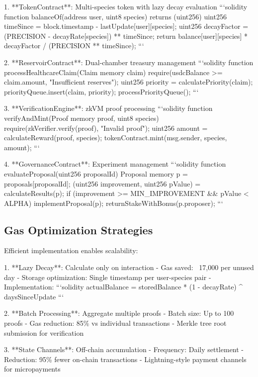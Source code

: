\documentclass[11pt,letterpaper]{article}
\begin{document}
1. **TokenContract**: Multi-species token with lazy decay evaluation
   ```solidity
   function balanceOf(address user, uint8 species) returns (uint256) {
       uint256 timeSince = block.timestamp - lastUpdate[user][species];
       uint256 decayFactor = (PRECISION - decayRate[species]) ** timeSince;
       return balance[user][species] * decayFactor / (PRECISION ** timeSince);
   }
   ```

2. **ReservoirContract**: Dual-chamber treasury management
   ```solidity
   function processHealthcareClaim(Claim memory claim) {
       require(usdcBalance >= claim.amount, "Insufficient reserves");
       uint256 priority = calculatePriority(claim);
       priorityQueue.insert(claim, priority);
       processPriorityQueue();
   }
   ```

3. **VerificationEngine**: zkVM proof processing
   ```solidity
   function verifyAndMint(Proof memory proof, uint8 species) {
       require(zkVerifier.verify(proof), "Invalid proof");
       uint256 amount = calculateReward(proof, species);
       tokenContract.mint(msg.sender, species, amount);
   }
   ```

4. **GovernanceContract**: Experiment management
   ```solidity
   function evaluateProposal(uint256 proposalId) {
       Proposal memory p = proposals[proposalId];
       (uint256 improvement, uint256 pValue) = calculateResults(p);
       if (improvement >= MIN_IMPROVEMENT && pValue < ALPHA) {
           implementProposal(p);
           returnStakeWithBonus(p.proposer);
       }
   }
   ```

\subsection{Gas Optimization Strategies}

Efficient implementation enables scalability:

1. **Lazy Decay**: Calculate only on interaction
   - Gas saved: ~17,000 per unused day
   - Storage optimization: Single timestamp per user-species pair
   - Implementation:
   ```solidity
   actualBalance = storedBalance * (1 - decayRate) ^ daysSinceUpdate
   ```

2. **Batch Processing**: Aggregate multiple proofs
   - Batch size: Up to 100 proofs
   - Gas reduction: 85\% vs individual transactions
   - Merkle tree root submission for verification

3. **State Channels**: Off-chain accumulation
   - Frequency: Daily settlement
   - Reduction: 95\% fewer on-chain transactions
   - Lightning-style payment channels for micropayments
\end{document}
